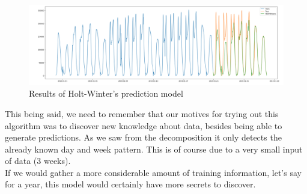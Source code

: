 \begin{figure}[h]
    \includegraphics[width=1\textwidth]{images/holt-winter-result.png}
    \caption{Results of Holt-Winter's prediction model}
    \label{fig:holt_winter_results}
\end{figure}

This being said, we need to remember that our motives for trying out this algorithm was to discover new knowledge about data, besides being able to generate predictions. As we saw from the decomposition it only detects the already known day and week pattern. This is of course due to a very small input of data (3 weeks). \\
If we would gather a more considerable amount of training information, let's say for a year, this model would certainly have more secrets to discover.
